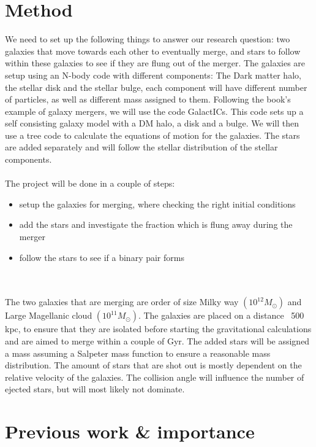 \documentclass{article}
\begin{document}
\section{Method}%
We need to set up the following things to answer our research question: two galaxies that move towards each other to eventually merge, and stars to follow within these galaxies to see if they are flung out of the merger. The galaxies are setup using an N-body code with different components: The Dark matter halo, the stellar disk and the stellar bulge, each component will have different number of particles, as well as different mass assigned to them. Following the book's example of galaxy mergers, we will use the code GalactICs.\cite{KuijkenDubinski} This code sets up a self consisting galaxy model with a DM halo, a disk and a bulge. We will then use a tree code to calculate the equations of motion for the galaxies. The stars are added separately and will follow the stellar distribution of the stellar components.\\
\\
The project will be done in a couple of steps:
\begin{itemize}
    \item setup the galaxies for merging, where checking the right initial conditions
    \item add the stars and investigate the fraction which is flung away during the merger
    \item follow the stars to see if a binary pair forms
\end{itemize}\\
\\
The two galaxies that are merging are order of size Milky way $(10^{12} M_{\odot})$ and Large Magellanic cloud $(10^{11} M_{\odot})$. The galaxies are placed on a distance ~500 kpc, to ensure that they are isolated before starting the gravitational calculations and are aimed to merge within a couple of Gyr\cite{Lotz_2008}. The added stars will be assigned a mass assuming a Salpeter mass function to ensure a reasonable mass distribution. The amount of stars that are shot out is mostly dependent on the relative velocity of the galaxies. The collision angle will influence the number of ejected stars, but will most likely not dominate.


\section{Previous work \& importance}%
\end{document}
